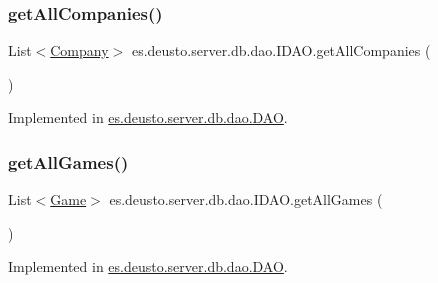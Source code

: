 \subsubsection{\texorpdfstring{get\+All\+Companies()}{getAllCompanies()}}
{\footnotesize\ttfamily List$<$\hyperlink{classes_1_1deusto_1_1server_1_1db_1_1data_1_1_company}{Company}$>$ es.\+deusto.\+server.\+db.\+dao.\+I\+D\+A\+O.\+get\+All\+Companies (\begin{DoxyParamCaption}{ }\end{DoxyParamCaption})}



Implemented in \hyperlink{classes_1_1deusto_1_1server_1_1db_1_1dao_1_1_d_a_o_ac564970c7e308393497e874655470aaa}{es.\+deusto.\+server.\+db.\+dao.\+D\+AO}.

\mbox{\label{interfacees_1_1deusto_1_1server_1_1db_1_1dao_1_1_i_d_a_o_aebafef372cf3064b12d16fcb651b41ff}} 
\subsubsection{\texorpdfstring{get\+All\+Games()}{getAllGames()}}
{\footnotesize\ttfamily List$<$\hyperlink{classes_1_1deusto_1_1server_1_1db_1_1data_1_1_game}{Game}$>$ es.\+deusto.\+server.\+db.\+dao.\+I\+D\+A\+O.\+get\+All\+Games (\begin{DoxyParamCaption}{ }\end{DoxyParamCaption})}



Implemented in \hyperlink{classes_1_1deusto_1_1server_1_1db_1_1dao_1_1_d_a_o_af49ed57bdac4dec48ab7616602d12df2}{es.\+deusto.\+server.\+db.\+dao.\+D\+AO}.

\mbox{\label{interfacees_1_1deusto_1_1server_1_1db_1_1dao_1_1_i_d_a_o_a96ad8de066318847a7828b12befe94f7}} 
